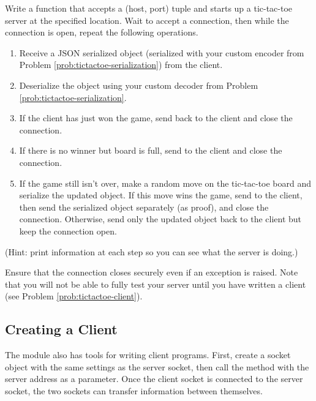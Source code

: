 \begin{problem}
Write a function that accepts a (host, port) tuple and starts up a tic-tac-toe server at the specified location.
Wait to accept a connection, then while the connection is open, repeat the following operations.
\begin{enumerate}
\item Receive a JSON serialized  object (serialized with your custom encoder from Problem \ref{prob:tictactoe-serialization}) from the client.
\item Deserialize the  object using your custom decoder from Problem \ref{prob:tictactoe-serialization}.
\item If the client has just won the game, send  back to the client and close the connection.
\item If there is no winner but board is full, send  to the client and close the connection.
\item If the game still isn't over, make a random move on the tic-tac-toe board and serialize the updated  object.
If this move wins the game, send  to the client, then send the serialized object separately (as proof), and close the connection.
Otherwise, send only the updated  object back to the client but keep the connection open.
\end{enumerate}
(Hint: print information at each step so you can see what the server is doing.)

Ensure that the connection closes securely even if an exception is raised.
Note that you will not be able to fully test your server until you have written a client (see Problem \ref{prob:tictactoe-client}).
\label{prob:tictactoe-server}
\end{problem}

\subsection*{Creating a Client} %

The  module also has tools for writing client programs.
First, create a socket object with the same settings as the server socket, then call the  method with the server address as a parameter.
Once the client socket is connected to the server socket, the two sockets can transfer information between themselves.

